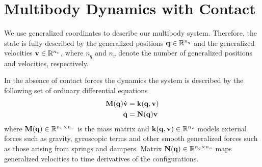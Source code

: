 
\section{Multibody Dynamics with Contact}
\label{sec:multibody_dynamics_with_contact}

We use generalized coordinates to describe our multibody system. Therefore, the
state is fully described by the generalized positions
${\mathbf{q}}\in\mathbb{R}^{n_q}$ and the generalized velocities
${\mathbf{v}}\in\mathbb{R}^{n_v}$, where $n_q$ and $n_v$ denote the number of
generalized positions and velocities, respectively.

In the absence of contact forces the dynamics the system is described
by the following set of ordinary differential equations
\begin{align}
    \mf{M}(\mf{q})\dot{\mf{v}}&=\mf{k}(\mf{q},\mf{v})
    \label{eq:momentum_continuous}\\
    \dot{\mf{q}}&=\mf{N}(\mf{q})\mf{v}
    \label{eq:v_to_qdot}
\end{align}
where ${\mathbf{M}}({\mathbf{q}})\in\mathbb{R}^{n_v\times n_v}$ is the mass matrix and
${\mathbf{k}}({\mathbf{q}},{\mathbf{v}})\in\mathbb{R}^{n_v}$ models external forces such as
gravity, gyroscopic terms and other smooth generalized forces such as those
arising from springs and dampers. Matrix ${\mathbf{N}}({\mathbf{q}})\in\mathbb{R}^{n_q\times
n_v}$ maps generalized velocities to time derivatives of the configurations.

